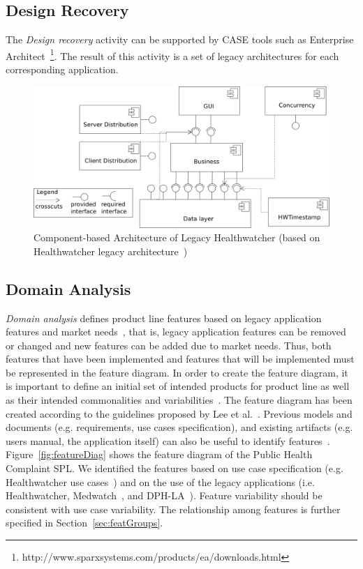 \documentclass[11pt,twoside]{article}
\begin{document}
\subsection{Design Recovery}
\label{sec:designRecovery}
The \textit{Design recovery} activity can be supported by CASE tools such as Enterprise
Architect~\footnote{http://www.sparxsystems.com/products/ea/downloads.html}. The result of this activity is a set of legacy architectures
for each corresponding application.

\begin{figure}[h!t!b!]
   \centering
    \includegraphics[scale=0.13]{figs/legacyHW-architecture.png}
   \caption{Component-based Architecture of Legacy Healthwatcher (based on Healthwatcher legacy architecture~\cite{hw-arch})}
   \label{fig:recoveredArch}
\end{figure}


\subsection{Domain Analysis}
\label{sec:domainAnalysis}
\textit{Domain analysis} defines product line features based on legacy application features and market needs~\cite{Kang:2006:FOR}, that is,
legacy application features can be removed or changed and new features can be added due to market needs. Thus,
both features that have been implemented and features that will be implemented must be represented in the feature diagram. In order to
create the feature diagram, it is important to define an initial set of intended products for product line as well as their intended
commonalities and variabilities~\cite{Pohl:2005:SPL}. The feature diagram has been created according to the guidelines proposed by Lee
et al.~\cite{Lee:2002:CGF}. Previous models and documents (e.g. requirements, use cases specification), and
existing artifacts (e.g. users manual, the application itself) can also be useful to identify features~\cite{John:2003:ERU}.             
Figure~\ref{fig:featureDiag} shows the feature diagram of the Public Health Complaint SPL. We identified the features based on use case
specification (e.g. Healthwatcher use cases~\cite{hw-usecase})  and on the use of the legacy applications (i.e. Healthwatcher,
Medwatch~\cite{medwatch}, and DPH-LA~\cite{dphla}). Feature variability should be consistent with use case variability. The relationship
among features is further specified in Section~\ref{sec:featGroups}.
\end{document}
